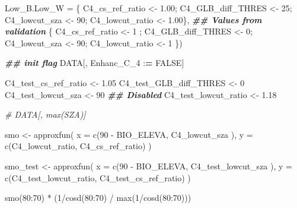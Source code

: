 \documentclass[
  10pt,
  a4paper,oneside]{article}
\newenvironment{Shaded}{\begin{snugshade}}{\end{snugshade}}
\newcommand{\AttributeTok}[1]{\textcolor[rgb]{0.77,0.63,0.00}{#1}}
\newcommand{\CommentTok}[1]{\textcolor[rgb]{0.56,0.35,0.01}{\textit{#1}}}
\newcommand{\ConstantTok}[1]{\textcolor[rgb]{0.00,0.00,0.00}{#1}}
\newcommand{\DecValTok}[1]{\textcolor[rgb]{0.00,0.00,0.81}{#1}}
\newcommand{\DocumentationTok}[1]{\textcolor[rgb]{0.56,0.35,0.01}{\textbf{\textit{#1}}}}
\newcommand{\ErrorTok}[1]{\textcolor[rgb]{0.64,0.00,0.00}{\textbf{#1}}}
\newcommand{\FloatTok}[1]{\textcolor[rgb]{0.00,0.00,0.81}{#1}}
\newcommand{\FunctionTok}[1]{\textcolor[rgb]{0.00,0.00,0.00}{#1}}
\newcommand{\NormalTok}[1]{#1}
\newcommand{\OtherTok}[1]{\textcolor[rgb]{0.56,0.35,0.01}{#1}}
\newcommand{\SpecialCharTok}[1]{\textcolor[rgb]{0.00,0.00,0.00}{#1}}
\begin{document}
\begin{Shaded}
\begin{Highlighting}[]
       \AttributeTok{Low\_B.Low\_W     =}\NormalTok{ \{ C4\_cs\_ref\_ratio }\OtherTok{\textless{}{-}} \FloatTok{1.00}\NormalTok{; C4\_GLB\_diff\_THRES }\OtherTok{\textless{}{-}} \DecValTok{25}\NormalTok{; C4\_lowcut\_sza }\OtherTok{\textless{}{-}} \DecValTok{90}\NormalTok{; C4\_lowcut\_ratio }\OtherTok{\textless{}{-}} \FloatTok{1.00}\NormalTok{\},   }\DocumentationTok{\#\# Values from validation}
\NormalTok{                         \{ C4\_cs\_ref\_ratio }\OtherTok{\textless{}{-}} \DecValTok{1}\NormalTok{   ; C4\_GLB\_diff\_THRES }\OtherTok{\textless{}{-}}  \DecValTok{0}\NormalTok{; C4\_lowcut\_sza }\OtherTok{\textless{}{-}} \DecValTok{90}\NormalTok{; C4\_lowcut\_ratio }\OtherTok{\textless{}{-}} \DecValTok{1}\NormalTok{   \})}


\DocumentationTok{\#\# init flag}
\NormalTok{DATA[, Enhanc\_C\_4 }\SpecialCharTok{:}\ErrorTok{=} \ConstantTok{FALSE}\NormalTok{]}

\NormalTok{C4\_test\_cs\_ref\_ratio   }\OtherTok{\textless{}{-}}  \FloatTok{1.05}
\NormalTok{C4\_test\_GLB\_diff\_THRES }\OtherTok{\textless{}{-}}  \DecValTok{0}
\NormalTok{C4\_test\_lowcut\_sza     }\OtherTok{\textless{}{-}} \DecValTok{90}  \DocumentationTok{\#\# Disabled}
\NormalTok{C4\_test\_lowcut\_ratio   }\OtherTok{\textless{}{-}}  \FloatTok{1.18}

\CommentTok{\# DATA[, max(SZA)]}

\NormalTok{smo }\OtherTok{\textless{}{-}} \FunctionTok{approxfun}\NormalTok{(}
  \AttributeTok{x =} \FunctionTok{c}\NormalTok{(}\DecValTok{90} \SpecialCharTok{{-}}\NormalTok{ BIO\_ELEVA,  C4\_lowcut\_sza  ),}
  \AttributeTok{y =} \FunctionTok{c}\NormalTok{(C4\_lowcut\_ratio, C4\_cs\_ref\_ratio)}
\NormalTok{)}

\NormalTok{smo\_test }\OtherTok{\textless{}{-}} \FunctionTok{approxfun}\NormalTok{(}
  \AttributeTok{x =} \FunctionTok{c}\NormalTok{(}\DecValTok{90} \SpecialCharTok{{-}}\NormalTok{ BIO\_ELEVA,       C4\_test\_lowcut\_sza  ),}
  \AttributeTok{y =} \FunctionTok{c}\NormalTok{(C4\_test\_lowcut\_ratio, C4\_test\_cs\_ref\_ratio)}
\NormalTok{)}

\FunctionTok{smo}\NormalTok{(}\DecValTok{80}\SpecialCharTok{:}\DecValTok{70}\NormalTok{) }\SpecialCharTok{*}\NormalTok{ (}\DecValTok{1}\SpecialCharTok{/}\FunctionTok{cosd}\NormalTok{(}\DecValTok{80}\SpecialCharTok{:}\DecValTok{70}\NormalTok{) }\SpecialCharTok{/} \FunctionTok{max}\NormalTok{(}\DecValTok{1}\SpecialCharTok{/}\FunctionTok{cosd}\NormalTok{(}\DecValTok{80}\SpecialCharTok{:}\DecValTok{70}\NormalTok{)))}
\end{Highlighting}
\end{Shaded}
\end{document}
